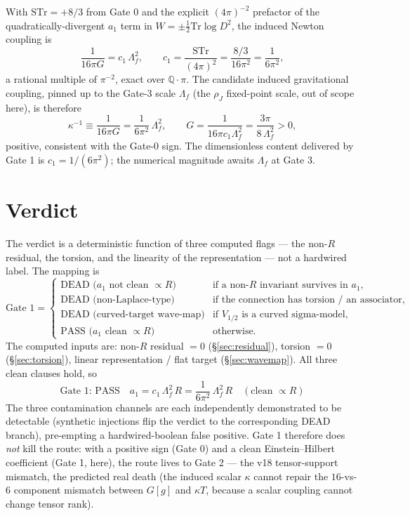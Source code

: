 \documentclass[11pt]{article}
\newcommand{\Tr}{\mathrm{Tr}}
\newcommand{\STr}{\mathrm{STr}}
\newcommand{\QQ}{\mathbb{Q}}
\begin{document}
With $\STr=+8/3$ from Gate 0 and the explicit $(4\pi)^{-2}$ prefactor of the
quadratically-divergent $a_1$ term in $W=\pm\tfrac12\Tr\log D^2$, the induced Newton coupling is
\begin{equation}\label{eq:c1}
\frac{1}{16\pi G}=c_1\,\Lambda_f^2,\qquad
c_1=\frac{\STr}{(4\pi)^2}=\frac{8/3}{16\pi^2}=\frac{1}{6\pi^2},
\end{equation}
a rational multiple of $\pi^{-2}$, exact over $\QQ\!\cdot\!\pi$. The candidate induced
gravitational coupling, pinned up to the Gate-3 scale $\Lambda_f$ (the $\rho_J$ fixed-point
scale, out of scope here), is therefore
\begin{equation}\label{eq:kappa-G}
\kappa^{-1}\equiv\frac{1}{16\pi G}=\frac{1}{6\pi^2}\,\Lambda_f^2,
\qquad
G=\frac{1}{16\pi c_1\Lambda_f^2}=\frac{3\pi}{8\,\Lambda_f^2}>0,
\end{equation}
positive, consistent with the Gate-0 sign. The dimensionless content delivered by Gate 1 is
$c_1=1/(6\pi^2)$; the numerical magnitude awaits $\Lambda_f$ at Gate 3.

\section{Verdict}\label{sec:verdict}

The verdict is a deterministic function of three computed flags --- the non-$R$ residual, the
torsion, and the linearity of the representation --- not a hardwired label. The mapping is
\begin{equation}\label{eq:verdict}
\text{Gate 1}=
\begin{cases}
\text{DEAD (}a_1\text{ not clean }\propto R\text{)} & \text{if a non-}R\text{ invariant survives in }a_1,\\
\text{DEAD (non-Laplace-type)} & \text{if the connection has torsion / an associator,}\\
\text{DEAD (curved-target wave-map)} & \text{if }V_{1/2}\text{ is a curved sigma-model,}\\
\text{PASS (}a_1\text{ clean }\propto R\text{)} & \text{otherwise.}
\end{cases}
\end{equation}
The computed inputs are: non-$R$ residual $=0$ (\S\ref{sec:residual}), torsion $=0$
(\S\ref{sec:torsion}), linear representation / flat target (\S\ref{sec:wavemap}). All three
clean clauses hold, so
\begin{equation}\label{eq:pass}
\boxed{\ \text{Gate 1: PASS}\quad a_1=c_1\,\Lambda_f^2\,R=\frac{1}{6\pi^2}\,\Lambda_f^2\,R\quad(\text{clean }\propto R)\ }
\end{equation}
The three contamination channels are each independently demonstrated to be detectable
(synthetic injections flip the verdict to the corresponding DEAD branch), pre-empting a
hardwired-boolean false positive. Gate 1 therefore does \emph{not} kill the route: with a
positive sign (Gate 0) and a clean Einstein--Hilbert coefficient (Gate 1, here), the route
lives to Gate 2 --- the v18 tensor-support mismatch, the predicted real death (the induced
scalar $\kappa$ cannot repair the $16$-vs-$6$ component mismatch between $G[g]$ and $\kappa T$,
because a scalar coupling cannot change tensor rank).
\end{document}
